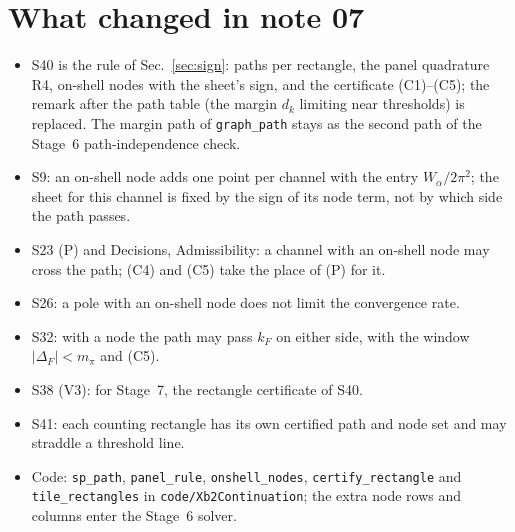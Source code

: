 \documentclass[11pt]{article}
\newcommand{\file}[1]{\nolinkurl{#1}}
\begin{document}
\section{What changed in note 07}
\begin{itemize}
\item S40 is the rule of Sec.~\ref{sec:sign}: paths per rectangle, the panel quadrature R4, on-shell nodes with the sheet's sign, and the certificate (C1)--(C5); the remark after the path table (the margin $d_k$ limiting near thresholds) is replaced. The margin path of \texttt{graph\_path} stays as the second path of the Stage~6 path-independence check.
\item S9: an on-shell node adds one point per channel with the entry $W_\alpha/2\pi^2$; the sheet for this channel is fixed by the sign of its node term, not by which side the path passes.
\item S23 (P) and Decisions, Admissibility: a channel with an on-shell node may cross the path; (C4) and (C5) take the place of (P) for it.
\item S26: a pole with an on-shell node does not limit the convergence rate.
\item S32: with a node the path may pass $k_F$ on either side, with the window $|\Delta_F|<m_\pi$ and (C5).
\item S38 (V3): for Stage~7, the rectangle certificate of S40.
\item S41: each counting rectangle has its own certified path and node set and may straddle a threshold line.
\item Code: \texttt{sp\_path}, \texttt{panel\_rule}, \texttt{onshell\_nodes}, \texttt{certify\_rectangle} and \texttt{tile\_rectangles} in \file{code/Xb2Continuation}; the extra node rows and columns enter the Stage~6 solver.
\end{itemize}
\end{document}
